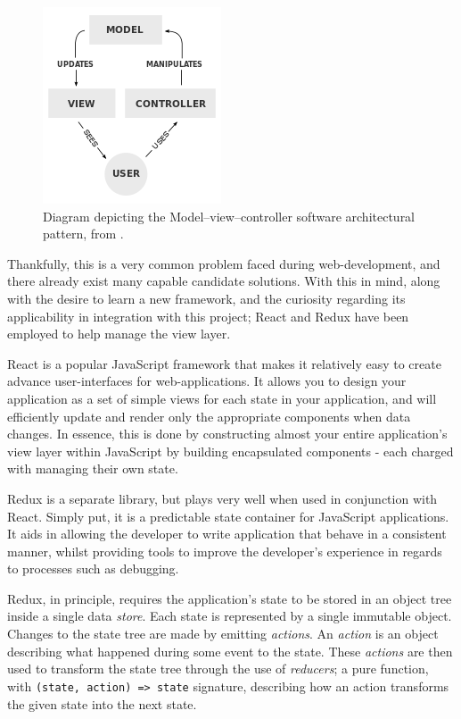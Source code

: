 \documentclass{standalone}
\begin{document}
			\begin{figure}[!htbp]
				\centering
				\includegraphics{resources/images/mvc.png}
				\caption{Diagram depicting the Model–view–controller software architectural pattern, from \parencite{MVC}.}
			\end{figure}

			Thankfully, this is a very common problem faced during web-development, and there already exist many capable candidate solutions. With this in mind, along with the desire to learn a new framework, and the curiosity regarding its applicability in integration with this project; React\parencite{React} and Redux\parencite{Redux} have been employed to help manage the view layer.

			React is a popular JavaScript framework that makes it relatively easy to create advance user-interfaces for web-applications. It allows you to design your application as a set of simple views for each state in your application, and will efficiently update and render only the appropriate components when data changes. In essence, this is done by constructing almost your entire application's view layer within JavaScript by building encapsulated components - each charged with managing their own state.

			Redux is a separate library, but plays very well when used in conjunction with React. Simply put, it is a predictable state container for JavaScript applications. It aids in allowing the developer to write application that behave in a consistent manner, whilst providing tools to improve the developer's experience in regards to processes such as debugging.

			Redux, in principle, requires the application's state to be stored in an object tree inside a single data \emph{store}. Each state is represented by a single immutable object. Changes to the state tree are made by emitting \emph{actions}. An \emph{action} is an object describing what happened during some event to the state. These \emph{actions} are then used to transform the state tree through the use of \emph{reducers}; a pure function, with \texttt{(state, action) => state} signature, describing how an action transforms the given state into the next state.
\end{document}
